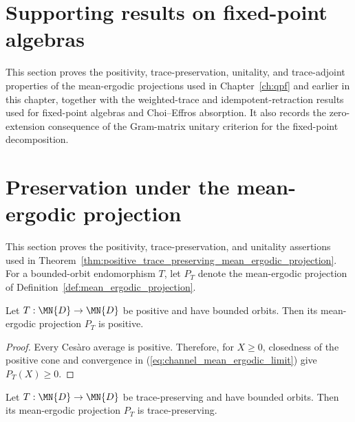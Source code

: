 \section{Supporting results on fixed-point algebras}
\label{ch:channel_asymptotics_supporting_results}
This section proves the positivity, trace-preservation, unitality, and
trace-adjoint properties of the mean-ergodic projections used in
Chapter~\ref{ch:qpf} and earlier in this chapter, together with the weighted-trace and idempotent-retraction results
used for fixed-point algebras and Choi--Effros absorption. It also records
the zero-extension consequence of the Gram-matrix unitary criterion for the
fixed-point decomposition.

\section{Preservation under the mean-ergodic projection}

This section proves the positivity, trace-preservation, and unitality assertions
used in Theorem~\ref{thm:positive_trace_preserving_mean_ergodic_projection}.
For a bounded-orbit endomorphism $T$, let $P_T$ denote the mean-ergodic
projection of Definition~\ref{def:mean_ergodic_projection}.

\begin{theorem}
    \label{thm:positive_mean_ergodic_projection}
    \leanok
    Let $T:\MN{D}\to\MN{D}$ be positive and have bounded orbits. Then its
    mean-ergodic projection $P_T$ is positive.
\end{theorem}

\begin{proof}\leanok
    Every Ces\`aro average is positive. Therefore, for $X\ge0$, closedness of
    the positive cone and convergence in
    (\ref{eq:channel_mean_ergodic_limit}) give $P_T(X)\ge0$.
\end{proof}

\begin{theorem}
    \label{thm:trace_preserving_mean_ergodic_projection}
    \leanok
    Let $T:\MN{D}\to\MN{D}$ be trace-preserving and have bounded orbits.
    Then its mean-ergodic projection $P_T$ is trace-preserving.
\end{theorem}

